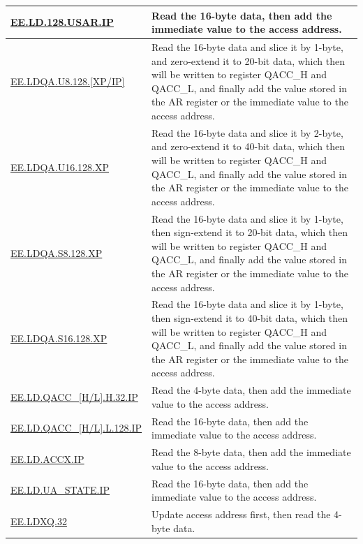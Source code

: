 \begin{longtable}[c]{|l|m{12cm}|}
    \\\hline
    \hyperref[instruction:EELD128USARIP]{EE.LD.128.USAR.IP} & Read the 16-byte data, then add the immediate value to the access address.
    \\\hline
    \hyperref[instruction:EELDQAU8128XP]{EE.LDQA.U8.128.[XP/IP]} & Read the 16-byte data and slice it by 1-byte, and zero-extend it to 20-bit data, which then will be written to register QACC\_H and QACC\_L, and finally add the value stored in the AR register or the immediate value to the access address.
    \\\hline
    \hyperref[instruction:EELDQAU16128XP]{EE.LDQA.U16.128.XP} & Read the 16-byte data and slice it by 2-byte, and zero-extend it to 40-bit data, which then will be written to register QACC\_H and QACC\_L, and finally add the value stored in the AR register or the immediate value to the access address.
    \\\hline
    \hyperref[instruction:EELDQAS8128XP]{EE.LDQA.S8.128.XP} & Read the 16-byte data and slice it by 1-byte, then sign-extend it to 20-bit data, which then will be written to register QACC\_H and QACC\_L, and finally add the value stored in the AR register or the immediate value to the access address.
    \\\hline
    \hyperref[instruction:EELDQAS16128XP]{EE.LDQA.S16.128.XP} & Read the 16-byte data and slice it by 1-byte, then sign-extend it to 40-bit data, which then will be written to register QACC\_H and QACC\_L, and finally add the value stored in the AR register or the immediate value to the access address.
    \\\hline
    \hyperref[instruction:EELDQACCHH32IP]{EE.LD.QACC\_[H/L].H.32.IP} & Read the 4-byte data, then add the immediate value to the access address.
    \\\hline
    \hyperref[instruction:EELDQACCHL128IP]{EE.LD.QACC\_[H/L].L.128.IP} & Read the 16-byte data, then add the immediate value to the access address.
    \\\hline
    \hyperref[instruction:EELDACCXIP]{EE.LD.ACCX.IP} & Read the 8-byte data, then add the immediate value to the access address.
    \\\hline
    \hyperref[instruction:EELDUASTATEIP]{EE.LD.UA\_STATE.IP} & Read the 16-byte data, then add the immediate value to the access address.
    \\\hline
    \hyperref[instruction:EELDXQ32]{EE.LDXQ.32} & Update access address first, then read the 4-byte data.
    \\\hline
\end{longtable}